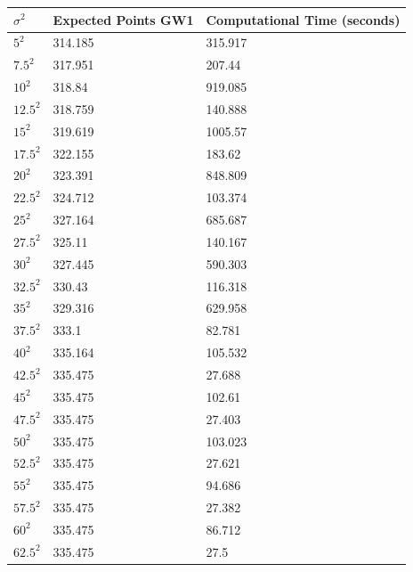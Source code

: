 \begin{table}[H]
\centering
\begin{tabular}{@{}lll@{}}
\toprule
$\sigma^2$ & Expected Points GW1 & Computational Time (seconds) \\ \midrule
$5^2$       & 314.185              & 315.917            \\
$7.5^2$     & 317.951             & 207.44             \\
$10^2$      & 318.84              & 919.085            \\
$12.5^2$    & 318.759             & 140.888            \\
$15^2$      & 319.619             & 1005.57            \\
$17.5^2$    & 322.155             & 183.62             \\
$20^2$       & 323.391             & 848.809            \\
$22.5^2$ & 324.712             & 103.374            \\
$25^2$       & 327.164             & 685.687            \\
$27.5^2$& 325.11              & 140.167            \\
$30^2$       & 327.445             & 590.303            \\
$32.5^2$     & 330.43              & 116.318            \\
$35^2$      & 329.316             & 629.958            \\
$37.5^2$     & 333.1               & 82.781             \\
$40^2$      & 335.164             & 105.532            \\
$42.5^2$    & 335.475             & 27.688             \\
$45^2$      & 335.475             & 102.61             \\
$47.5^2$    & 335.475             & 27.403             \\
$50^2$      & 335.475             & 103.023            \\
$52.5^2$    & 335.475             & 27.621             \\
$55^2$      & 335.475             & 94.686             \\
$57.5^2$     & 335.475             & 27.382             \\
$60^2$      & 335.475             & 86.712             \\
$62.5^2$     & 335.475             & 27.5               \\

\end{tabular}
\end{table}
